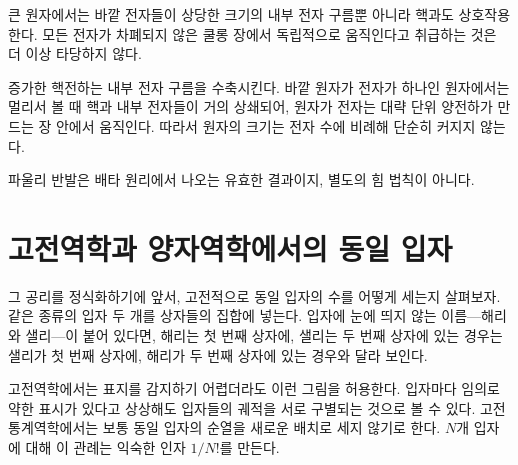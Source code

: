 큰 원자에서는 바깥 전자들이 상당한 크기의 내부 전자 구름뿐 아니라 핵과도 상호작용한다. 모든 전자가 차폐되지 않은 쿨롱 장에서 독립적으로 움직인다고 취급하는 것은 더 이상 타당하지 않다.

\begin{classroomqa}
\end{classroomqa}

증가한 핵전하는 내부 전자 구름을 수축시킨다. 바깥 원자가 전자가 하나인 원자에서는 멀리서 볼 때 핵과 내부 전자들이 거의 상쇄되어, 원자가 전자는 대략 단위 양전하가 만드는 장 안에서 움직인다. 따라서 원자의 크기는 전자 수에 비례해 단순히 커지지 않는다.

\begin{classroomqa}
\end{classroomqa}

파울리 반발은 배타 원리에서 나오는 유효한 결과이지, 별도의 힘 법칙이 아니다.

\begin{classroomqa}
\end{classroomqa}

\section{고전역학과 양자역학에서의 동일 입자}

그 공리를 정식화하기에 앞서, 고전적으로 동일 입자의 수를 어떻게 세는지 살펴보자. 같은 종류의 입자 두 개를 상자들의 집합에 넣는다. 입자에 눈에 띄지 않는 이름---해리와 샐리---이 붙어 있다면, 해리는 첫 번째 상자에, 샐리는 두 번째 상자에 있는 경우는 샐리가 첫 번째 상자에, 해리가 두 번째 상자에 있는 경우와 달라 보인다.

고전역학에서는 표지를 감지하기 어렵더라도 이런 그림을 허용한다. 입자마다 임의로 약한 표시가 있다고 상상해도 입자들의 궤적을 서로 구별되는 것으로 볼 수 있다. 고전 통계역학에서는 보통 동일 입자의 순열을 새로운 배치로 세지 않기로 한다. \(N\)개 입자에 대해 이 관례는 익숙한 인자 \(1/N!\)를 만든다.


